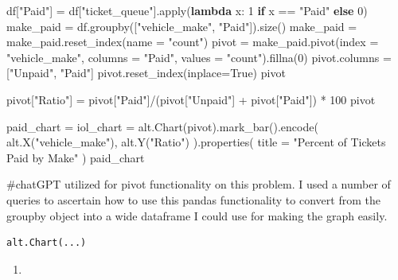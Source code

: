 \documentclass[
  letterpaper,
  DIV=11,
  numbers=noendperiod]{scrartcl}
\newenvironment{Shaded}{\begin{snugshade}}{\end{snugshade}}
\newcommand{\BuiltInTok}[1]{\textcolor[rgb]{0.00,0.23,0.31}{#1}}
\newcommand{\CommentTok}[1]{\textcolor[rgb]{0.37,0.37,0.37}{#1}}
\newcommand{\ControlFlowTok}[1]{\textcolor[rgb]{0.00,0.23,0.31}{\textbf{#1}}}
\newcommand{\DecValTok}[1]{\textcolor[rgb]{0.68,0.00,0.00}{#1}}
\newcommand{\KeywordTok}[1]{\textcolor[rgb]{0.00,0.23,0.31}{\textbf{#1}}}
\newcommand{\NormalTok}[1]{\textcolor[rgb]{0.00,0.23,0.31}{#1}}
\newcommand{\OperatorTok}[1]{\textcolor[rgb]{0.37,0.37,0.37}{#1}}
\newcommand{\StringTok}[1]{\textcolor[rgb]{0.13,0.47,0.30}{#1}}
\newcommand{\VariableTok}[1]{\textcolor[rgb]{0.07,0.07,0.07}{#1}}
\providecommand{\tightlist}{%
  \setlength{\itemsep}{0pt}\setlength{\parskip}{0pt}}\usepackage{longtable,booktabs,array}
\begin{document}
\begin{Shaded}
\begin{Highlighting}[]
\NormalTok{df[}\StringTok{"Paid"}\NormalTok{] }\OperatorTok{=}\NormalTok{ df[}\StringTok{"ticket\_queue"}\NormalTok{].}\BuiltInTok{apply}\NormalTok{(}\KeywordTok{lambda}\NormalTok{ x: }\DecValTok{1} \ControlFlowTok{if}\NormalTok{ x }\OperatorTok{==} \StringTok{"Paid"} \ControlFlowTok{else} \DecValTok{0}\NormalTok{)}
\NormalTok{make\_paid }\OperatorTok{=}\NormalTok{ df.groupby([}\StringTok{"vehicle\_make"}\NormalTok{, }\StringTok{"Paid"}\NormalTok{]).size()}
\NormalTok{make\_paid }\OperatorTok{=}\NormalTok{ make\_paid.reset\_index(name }\OperatorTok{=} \StringTok{"count"}\NormalTok{)}
\NormalTok{pivot }\OperatorTok{=}\NormalTok{ make\_paid.pivot(index }\OperatorTok{=} \StringTok{"vehicle\_make"}\NormalTok{, columns }\OperatorTok{=} \StringTok{"Paid"}\NormalTok{, values }\OperatorTok{=} \StringTok{"count"}\NormalTok{).fillna(}\DecValTok{0}\NormalTok{)}
\NormalTok{pivot.columns }\OperatorTok{=}\NormalTok{ [}\StringTok{"Unpaid"}\NormalTok{, }\StringTok{"Paid"}\NormalTok{]}
\NormalTok{pivot.reset\_index(inplace}\OperatorTok{=}\VariableTok{True}\NormalTok{)}
\NormalTok{pivot}

\NormalTok{pivot[}\StringTok{"Ratio"}\NormalTok{] }\OperatorTok{=}\NormalTok{ pivot[}\StringTok{"Paid"}\NormalTok{]}\OperatorTok{/}\NormalTok{(pivot[}\StringTok{"Unpaid"}\NormalTok{] }\OperatorTok{+}\NormalTok{ pivot[}\StringTok{"Paid"}\NormalTok{]) }\OperatorTok{*} \DecValTok{100}
\NormalTok{pivot}

\NormalTok{paid\_chart }\OperatorTok{=}\NormalTok{ iol\_chart }\OperatorTok{=}\NormalTok{ alt.Chart(pivot).mark\_bar().encode(}
\NormalTok{    alt.X(}\StringTok{"vehicle\_make"}\NormalTok{),}
\NormalTok{    alt.Y(}\StringTok{"Ratio"}\NormalTok{)}
\NormalTok{).properties(}
\NormalTok{    title }\OperatorTok{=} \StringTok{"Percent of Tickets Paid by Make"}
\NormalTok{)}
\NormalTok{paid\_chart}

\CommentTok{\#chatGPT utilized for pivot functionality on this problem. I used a number of queries to ascertain how to use this pandas functionality to convert from the groupby object into a wide dataframe I could use for making the graph easily.}
\end{Highlighting}
\end{Shaded}

\begin{verbatim}
alt.Chart(...)
\end{verbatim}

\begin{enumerate}
\def\labelenumi{\arabic{enumi}.}
\tightlist
\item
\end{enumerate}
\end{document}
